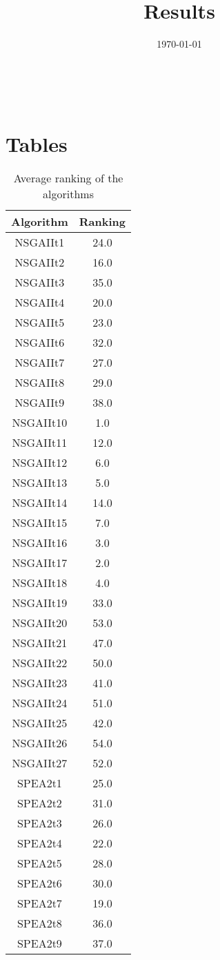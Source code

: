 \documentclass{article}
\title{Results}
\author{}
\date{\today}
\begin{document}
\oddsidemargin 0in \topmargin 0in\maketitle
\
\section{Tables}
\begin{table}[!htp]
\centering
\caption{Average ranking of the algorithms}
\begin{tabular}{c|c}
Algorithm&Ranking\\
\hline
NSGAIIt1&24.0\\
NSGAIIt2&16.0\\
NSGAIIt3&35.0\\
NSGAIIt4&20.0\\
NSGAIIt5&23.0\\
NSGAIIt6&32.0\\
NSGAIIt7&27.0\\
NSGAIIt8&29.0\\
NSGAIIt9&38.0\\
NSGAIIt10&1.0\\
NSGAIIt11&12.0\\
NSGAIIt12&6.0\\
NSGAIIt13&5.0\\
NSGAIIt14&14.0\\
NSGAIIt15&7.0\\
NSGAIIt16&3.0\\
NSGAIIt17&2.0\\
NSGAIIt18&4.0\\
NSGAIIt19&33.0\\
NSGAIIt20&53.0\\
NSGAIIt21&47.0\\
NSGAIIt22&50.0\\
NSGAIIt23&41.0\\
NSGAIIt24&51.0\\
NSGAIIt25&42.0\\
NSGAIIt26&54.0\\
NSGAIIt27&52.0\\
SPEA2t1&25.0\\
SPEA2t2&31.0\\
SPEA2t3&26.0\\
SPEA2t4&22.0\\
SPEA2t5&28.0\\
SPEA2t6&30.0\\
SPEA2t7&19.0\\
SPEA2t8&36.0\\
SPEA2t9&37.0\\

\end{tabular}
\end{table}
\end{document}
